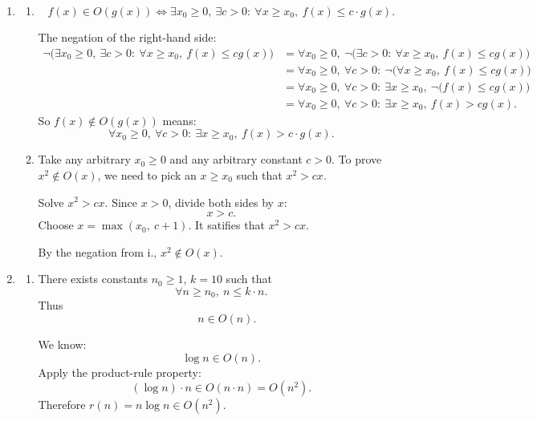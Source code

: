 \documentclass[12pt]{article}
\begin{document}
\begin{enumerate}
    \item [(a)]
    \begin{enumerate}
        \item [i.]
        \[
        f(x) \in O(g(x)) \iff \exists x_0 \ge 0,\ \exists c > 0:\ \forall x \ge x_0,\ f(x) \le c\cdot g(x).
        \]
        
        The negation of the right-hand side:
        \begin{align*}
        \neg\Big(\exists x_0 \ge 0,\ \exists c > 0:\ \forall x \ge x_0,\ f(x) \le c g(x)\Big)
        &= \forall x_0 \ge 0,\ \neg\Big(\exists c > 0:\ \forall x \ge x_0,\ f(x) \le c g(x)\Big) \\
        &= \forall x_0 \ge 0,\ \forall c > 0:\ \neg\Big(\forall x \ge x_0,\ f(x) \le c g(x)\Big) \\
        &= \forall x_0 \ge 0,\ \forall c > 0:\ \exists x \ge x_0,\ \neg\big(f(x) \le c g(x)\big) \\
        &= \forall x_0 \ge 0,\ \forall c > 0:\ \exists x \ge x_0,\ f(x) > c g(x).
        \end{align*}
        So $f(x)\notin O(g(x))$ means:
        \[
        {\forall x_0 \ge 0,\ \forall c > 0:\ \exists x \ge x_0,\ f(x) > c\cdot g(x)}.
        \]

        
        \item[ii.]

        Take any arbitrary $x_0\ge 0$ and any arbitrary constant $c>0$.
        To prove $x^2 \notin O(x)$, we need to pick an $x \ge x_0$ such that $x^2 > c x$.
        
        Solve $x^2 > c x$. Since $x>0$, divide both sides by $x$:
        \[
        x > c.
        \]
        Choose $x = \max(x_0,\ c+1)$. It satifies that $x^2 > c x$.


        By the negation from i., $x^2 \notin O(x)$.
    \end{enumerate}

    \item [(b)]
    \begin{enumerate}
        \item [i.]
        There exists constants $n_0\ge1$, $k=10$ such that
        \[
        \forall n\ge n_0,\  n \le k\cdot n.
        \]
        Thus
        \[
        \quad n\in O(n).
        \]

        We know:
        \[
        \log n \in O(n).
        \]
        Apply the product-rule property:
        \[
        (\log n)\cdot n \in O(n\cdot n) = O(n^2).
        \]
        Therefore $r(n)=n\log n \in O(n^2)$.
        

\end{enumerate}
\end{enumerate}
\end{document}
